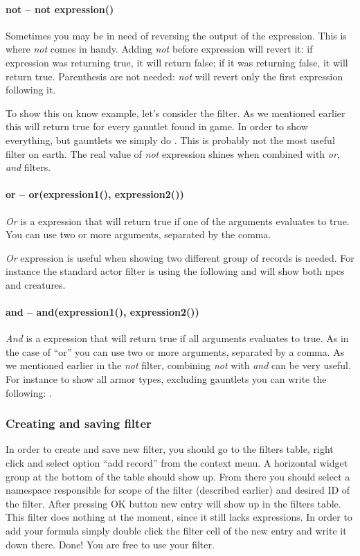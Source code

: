 \paragraph{not -- not expression()}
Sometimes you may be in need of reversing the output of the expression. This is where \textit{not} comes in handy. Adding \textit{not} before
expression will revert it: if expression was returning true, it will return false; if it was returning false, it will return true. Parenthesis are not needed: \textit{not} will revert only the first expression following it.

To show this on know example, let's consider the  filter. As we mentioned earlier this will return true
for every gauntlet found in game. In order to show everything, but gauntlets we simply do .
This is probably not the most useful filter on earth. The real value of \textit{not} expression shines when combined with
\textit{or}, \textit{and} filters.

\paragraph{or -- or(expression1(), expression2())}
\textit{Or} is a expression that will return true if one of the arguments evaluates to true. You can use two or more arguments, separated by the comma.

\textit{Or} expression is useful when showing two different group of records is needed. For instance the standard actor filter is using the following
 and will show both npcs and creatures.

\paragraph{and -- and(expression1(), expression2())}
\textit{And} is a expression that will return true if all arguments evaluates to true. As in the case of ``or'' you can use two or more arguments,
separated by a comma.
As we mentioned earlier in the \textit{not} filter, combining \textit{not} with \textit{and} can be very useful. For instance to show all armor types,
excluding gauntlets you can write the following: .

\subsubsection{Creating and saving filter}
In order to create and save new filter, you should go to the filters table, right click and select option ``add record'' from the context menu.
A horizontal widget group at the bottom of the table should show up. From there you should select a namespace responsible for scope of
the filter (described earlier) and desired ID of the filter. After pressing OK button new entry will show up in the filters table. This filter
does nothing at the moment, since it still lacks expressions. In order to add your formula simply double click the filter cell of the new entry
and write it down there.
Done! You are free to use your filter.

